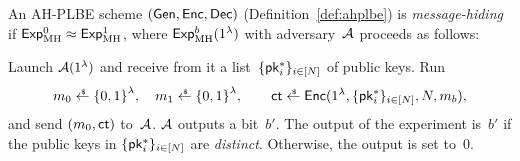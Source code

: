 \begin{definition}\label{def:ahplbe-message-hiding}
An AH-PLBE scheme $({\smash{\mathsf{Gen}}},{\smash{\mathsf{Enc}}},{\smash{\mathsf{Dec}}})$ (Definition~\ref{def:ahplbe})
is \emph{message-hiding} if ${{\smash{\mathsf{Exp}}_{\textup{MH}}^{0}}\approx{\smash{\mathsf{Exp}}_{\textup{MH}}^{1}}}$,
where ${\smash{\mathsf{Exp}}_{\textup{MH}}^{b}}(1^\lambda)$ with adversary~${\mathcal{A}}$ proceeds as follows:
\begin{security}
Launch ${\mathcal{A}}(1^\lambda)$ and
receive from it a list~$\{{\smash{\mathsf{pk}}}_i^\ast\}_{i\in[N]}$ of public keys.
Run
\begin{align*}
m_0\draws\bit^\lambda,\quad
m_1\draws\bit^\lambda,\qquad
\ct\draws\Enc(1^\lambda,\{\pk_i^\ast\}_{i\in[N]},N,m_b),
\end{align*}
and send $(m_0,{\smash{\mathsf{ct}}})$ to~${\mathcal{A}}$.
${\mathcal{A}}$ outputs a bit~$b'$.
The output of the experiment is~$b'$
if the public keys in $\{{\smash{\mathsf{pk}}}_i^\ast\}_{i\in[N]}$ are \emph{distinct}.
Otherwise, the output is set to~$0$.
\end{security}
\end{definition}
